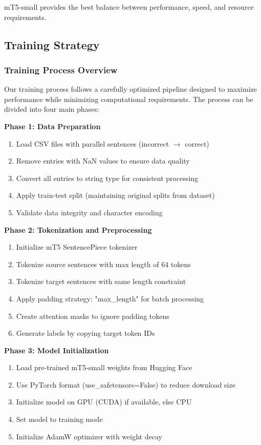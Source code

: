 \documentclass[12pt,a4paper]{article}
\begin{document}
mT5-small provides the best balance between performance, speed, and resource requirements.

\subsection{Training Strategy}

\subsubsection{Training Process Overview}
Our training process follows a carefully optimized pipeline designed to maximize performance while minimizing computational requirements. The process can be divided into four main phases:

\textbf{Phase 1: Data Preparation}
\begin{enumerate}
    \item Load CSV files with parallel sentences (incorrect $\rightarrow$ correct)
    \item Remove entries with NaN values to ensure data quality
    \item Convert all entries to string type for consistent processing
    \item Apply train-test split (maintaining original splits from dataset)
    \item Validate data integrity and character encoding
\end{enumerate}

\textbf{Phase 2: Tokenization and Preprocessing}
\begin{enumerate}
    \item Initialize mT5 SentencePiece tokenizer
    \item Tokenize source sentences with max length of 64 tokens
    \item Tokenize target sentences with same length constraint
    \item Apply padding strategy: "max\_length" for batch processing
    \item Create attention masks to ignore padding tokens
    \item Generate labels by copying target token IDs
\end{enumerate}

\textbf{Phase 3: Model Initialization}
\begin{enumerate}
    \item Load pre-trained mT5-small weights from Hugging Face
    \item Use PyTorch format (use\_safetensors=False) to reduce download size
    \item Initialize model on GPU (CUDA) if available, else CPU
    \item Set model to training mode
    \item Initialize AdamW optimizer with weight decay
\end{enumerate}
\end{document}
